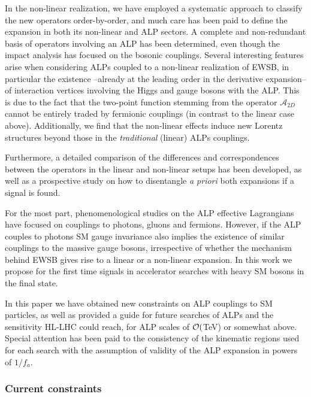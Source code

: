 \documentclass[11pt]{article}
\newcommand{\A}{\mathcal{A}}
\renewcommand{\[}{\begin{equation}}
\renewcommand{\]}{\end{equation}}
\begin{document}
 In the non-linear realization, we have employed a systematic approach to classify the new operators order-by-order, and much care 
 has been paid to define the expansion in both its non-linear and ALP sectors.  A complete and non-redundant basis of operators  involving 
 an ALP has been determined, even though  the impact analysis has focused on the bosonic couplings. Several interesting features arise when 
 considering ALPs coupled to a non-linear realization of EWSB, in particular the existence --already at the leading order in the 
 derivative expansion-- of interaction vertices involving the Higgs and gauge bosons with the ALP. This is due to the fact that the two-point function stemming from the operator $\A_{2D}$  cannot be entirely traded 
 by fermionic couplings (in contrast to the linear case above).  Additionally, we find that the non-linear effects induce new Lorentz structures beyond those 
 in the {\it traditional} (linear) ALPs couplings.   
 
 
 Furthermore, a detailed comparison of the differences and correspondences between 
 the operators in the linear and non-linear setups has been developed, as well as a prospective study on how to  disentangle {\it a priori} 
 both expansions if a signal is found.
  
 

For the most part, phenomenological studies on the ALP effective Lagrangians have focused on couplings to photons, gluons and fermions. 
However,  if the ALP couples to photons SM gauge invariance also implies the existence of similar couplings 
to the massive gauge bosons, irrespective of whether the mechanism behind EWSB gives rise to a linear or a non-linear expansion. In this work we propose for the first time signals in accelerator searches with heavy SM bosons in the final state.

In this paper we have obtained new constraints on ALP couplings to SM particles, as well as provided a guide for future searches of 
ALPs and the sensitivity HL-LHC could reach, for ALP scales of $\cal{O}($TeV) or somewhat above.  Special attention has been paid 
to the consistency of the kinematic regions used for each search with the assumption of validity of the ALP expansion in powers of $1/f_a$.

\vspace{-2mm}

\subsubsection*{Current constraints}
\end{document}
